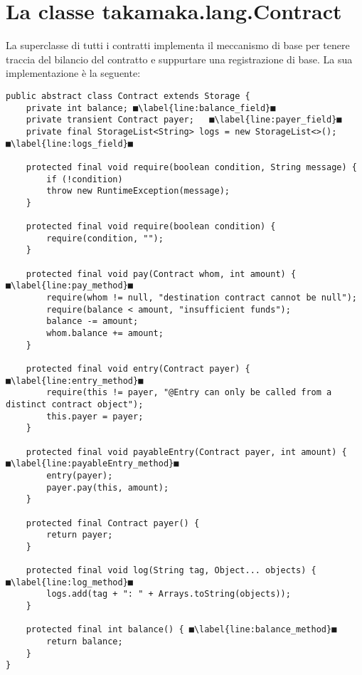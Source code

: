 \section{La classe takamaka.lang.Contract} \label{sec:contract-class}
La superclasse di tutti i contratti implementa il meccanismo di base per tenere traccia del bilancio del contratto e suppurtare una registrazione di base. La sua implementazione è la seguente:
%
\begin{lstlisting}
public abstract class Contract extends Storage {
	private int balance; ■\label{line:balance_field}■
	private transient Contract payer;   ■\label{line:payer_field}■
	private final StorageList<String> logs = new StorageList<>(); ■\label{line:logs_field}■
	
	protected final void require(boolean condition, String message) {
		if (!condition)
		throw new RuntimeException(message);
	}
	
	protected final void require(boolean condition) {
		require(condition, "");
	}
	
	protected final void pay(Contract whom, int amount) { ■\label{line:pay_method}■
		require(whom != null, "destination contract cannot be null");
		require(balance < amount, "insufficient funds");
		balance -= amount;
		whom.balance += amount;
	}
	
	protected final void entry(Contract payer) { ■\label{line:entry_method}■
		require(this != payer, "@Entry can only be called from a distinct contract object");
		this.payer = payer;
	}
	
	protected final void payableEntry(Contract payer, int amount) { ■\label{line:payableEntry_method}■
		entry(payer);
		payer.pay(this, amount);
	}
	
	protected final Contract payer() {
		return payer;
	}
	
	protected final void log(String tag, Object... objects) { ■\label{line:log_method}■
		logs.add(tag + ": " + Arrays.toString(objects));
	}
	
	protected final int balance() { ■\label{line:balance_method}■
		return balance;
	}
}
\end{lstlisting}
%
